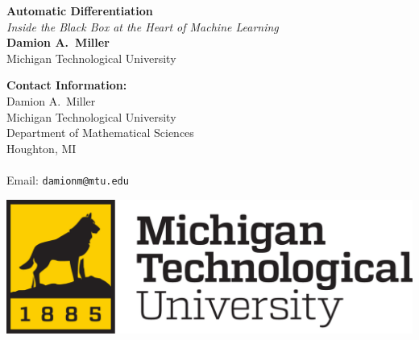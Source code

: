 \documentclass[a0,landscape]{a0poster}
\begin{document}


\begin{minipage}[b]{0.58\linewidth}
  \veryHuge \color{NavyBlue} \textbf{Automatic Differentiation} \color{Black}\\ %
  \Huge\textit{Inside the Black Box at the Heart of Machine Learning}\\[1cm] %
  \huge \textbf{Damion A.~Miller}\\ %
  \huge Michigan Technological University\\ %
\end{minipage}
%
\begin{minipage}[b]{0.22\linewidth}
  \Large \textbf{Contact Information:}\\
  Damion A.~Miller\\
  Michigan Technological University\\
  Department of Mathematical Sciences \\
  Houghton, MI\\\\
  Email: \texttt{damionm@mtu.edu}\\ %
\end{minipage}
%
\begin{minipage}[b]{0.19\linewidth}
  \includegraphics[width=20cm]{figures/logo.png} %
  \vspace*{2in}
\end{minipage}
\end{document}
